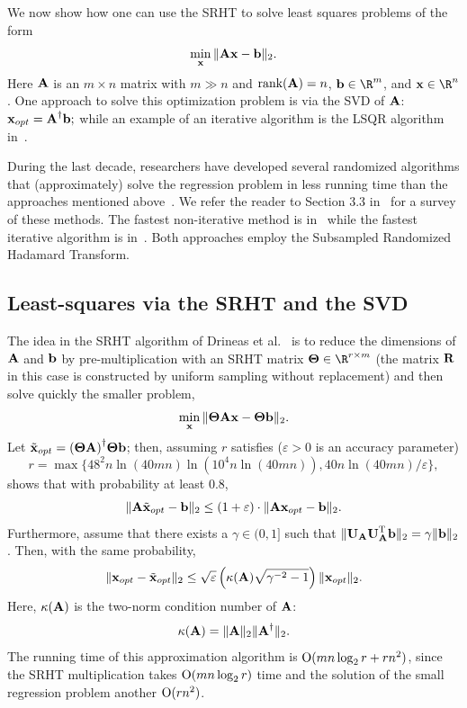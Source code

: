 We now show how one can use the SRHT to  solve least squares problems of the form
$$ \min_{{\mathbf x}} \mbox{}\| {\bm{\mathrm{A}}} {\mathbf x} - {\mathbf b} \|_2. $$
Here ${\bm{\mathrm{A}}}$ is an $m \times n$ matrix with $m \gg n$ and $\hbox{\rm rank}({\bm{\mathrm{A}}})=n$, $\b \in \R^m$, and $\x \in \R^n$.
One approach to solve this optimization problem is via the  SVD of ${\bm{\mathrm{A}}}$: $ {\mathbf x}_{opt} = {{\bm{\mathrm{A}}}}^\dagger {\mathbf b};$
while an example of an iterative algorithm is the LSQR algorithm in~\cite{PS82}.

During the last decade, researchers have developed several randomized algorithms that (approximately) solve the
regression problem in less running time than the approaches mentioned above~\cite{Sar06,RT08,Zou10,AMT10,DMMS11}. We refer the reader to Section 3.3 in~\cite{Bou11a} for a survey of these methods. The fastest non-iterative method is in~\cite{DMMS11} while the fastest iterative algorithm is in~\cite{RT08,AMT10}.
Both approaches employ the Subsampled Randomized Hadamard Transform. %

\subsection{Least-squares via the SRHT and the SVD}
The idea in the SRHT algorithm of Drineas et al.~\cite{DMMS11} is to reduce the dimensions of ${\bm{\mathrm{A}}}$ and ${\mathbf b}$ by pre-multiplication
with an SRHT matrix $\matTh \in \R^{r \times m}$ (the matrix ${\bm{\mathrm{R}}}$ in this case is constructed by uniform sampling without replacement)
and then solve quickly the smaller problem,
$$ \min_{{\mathbf x}} \mbox{}\| {\bm{\mathrm{\Theta}}} {\bm{\mathrm{A}}} {\mathbf x} - {\bm{\mathrm{\Theta}}}{\mathbf b} \|_2. $$
Let $\tilde{{\mathbf x}}_{opt} = { \left( {\bm{\mathrm{\Theta}}} {\bm{\mathrm{A}}} \right) }^\dagger {\ensuremath{\bm{\mathrm{\Theta}}}} {\mathbf b}$; then, assuming $r$ satisfies ($\varepsilon > 0$ is an accuracy parameter)
$$ r = \max\{  48^2 n \ln(40 m n) \ln (10^4 n \ln(40 m n)) ,   40 n \ln(40 m n) / \varepsilon  \}, $$
\cite{DMMS11} shows that with probability at least $0.8$,
$$  \mbox{}\|  {\bm{\mathrm{A}}} \tilde{{\mathbf x}}_{opt} - {\mathbf b} \|_2 \le \left( 1 + \varepsilon \right) \cdot   \mbox{}\|  {\bm{\mathrm{A}}} {\mathbf x}_{opt} - {\mathbf b} \|_2. $$
Furthermore, assume that there exists a $\gamma \in (0,1]$ such that $ \mbox{}\|{\bm{\mathrm{U}}}_{{\bm{\mathrm{A}}}} {\bm{\mathrm{U}}}_{{\bm{\mathrm{A}}}}^{\textsc{T}}{\mathbf b}\|_2 = \gamma \mbox{}\|{\mathbf b}\|_2$.
Then, with the same probability,
\[
 \mbox{}\| {\mathbf x}_{opt} - \tilde{{\mathbf x}}_{opt} \|_2 \le \sqrt{\varepsilon} \left( \kappa{ \left( {\ensuremath{\bm{\mathrm{A}}}}\right)} \sqrt{ \gamma^{-2}   - 1 } \right) \mbox{}\|{\mathbf x}_{opt}\|_2.
\]
Here, $\kappa({\bm{\mathrm{A}}})$ is the two-norm condition number of ${\bm{\mathrm{A}}}$:
\[
\kappa({\bm{\mathrm{A}}}) = \mbox{}\|{\bm{\mathrm{A}}}\|_2\mbox{}\|{{\bm{\mathrm{A}}}}^\dagger\|_2.
\]
The running time of this approximation algorithm is $\mathrm{O}(  m n \log_2 r + rn^2)$,
since the SRHT multiplication takes $\mathrm{O}(  m n \log_2 r)$ time and the solution of the small regression problem
another $\mathrm{O}(rn^2)$.

